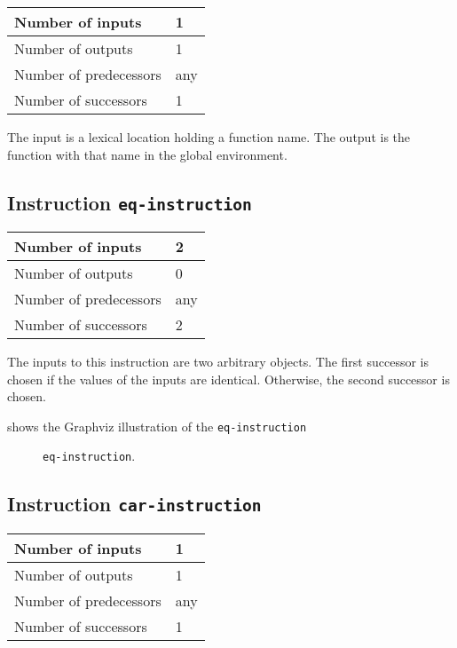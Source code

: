 \begin{tabular}{|l|l|}
  \hline
  Number of inputs & 1\\
  \hline
  Number of outputs & 1\\
  \hline
  Number of predecessors & any\\
  \hline
  Number of successors & 1\\
  \hline
\end{tabular}

The input is a lexical location holding a function name. The output
is the function with that name in the global environment.

\subsection{Instruction \texttt{eq-instruction}}
\label{mir-instruction-eq}

\begin{tabular}{|l|l|}
\hline
Number of inputs & 2\\
\hline
Number of outputs & 0\\
\hline
Number of predecessors & any\\
\hline
Number of successors & 2\\
\hline
\end{tabular}

The inputs to this instruction are two arbitrary \commonlisp{}
objects.  The first successor is chosen if the values of the inputs
are identical.  Otherwise, the second successor is chosen.

 shows the Graphviz illustration of the
\texttt{eq-instruction}

\begin{figure}
\begin{center}
\end{center}
\caption{\label{fig-eq-instruction}
\texttt{eq-instruction}.}
\end{figure}

\subsection{Instruction \texttt{car-instruction}}
\label{mir-instruction-car}

\begin{tabular}{|l|l|}
\hline
Number of inputs & 1\\
\hline
Number of outputs & 1\\
\hline
Number of predecessors & any\\
\hline
Number of successors & 1\\
\hline
\end{tabular}

